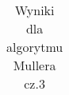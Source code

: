 \documentclass[a4paper, 11pt]{article}
\begin{document}
\begin{enumerate}
\begin{itemize}
\begin{table}
\begin{tabular}{|c|c|c|c|c|c|}
\hline                                                                                        
\end{tabular}  
\caption{Wyniki dla algorytmu Mullera cz.3}                                                                                                                                                                                          
\label{table:Wyniki dla algorytmu Mullera}                                                                                                                                                                                        
\end{table}                                                                                                                                                                                                       
     



\end{itemize}
\end{enumerate}
\end{document}
